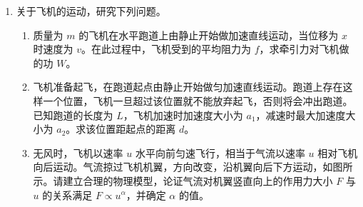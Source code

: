 \documentclass[\gkver]{gaokaozhenti}
\begin{document}
\begin{enumerate}
{粒子 2 的动量 $p_{2} = mv_{2}$

结合前面的分析可得 $p_{2} = \frac{qBR}{v_{1}} \cdot v_{2} = \frac{qBR \cdot d}{\theta R} = \frac{qBd}{\theta}$。
}

\item
关于飞机的运动，研究下列问题。
\begin{enumerate}
	\item
	质量为 $m$ 的飞机在水平跑道上由静止开始做加速直线运动，当位移为 $x$ 时速度为 $v$。在此过程中，飞机受到的平均阻力为 $f$，求牵引力对飞机做的功 $W$。
	\item
	飞机准备起飞，在跑道起点由静止开始做匀加速直线运动。跑道上存在这样一个位置，飞机一旦超过该位置就不能放弃起飞，否则将会冲出跑道。已知跑道的长度为 $L$，飞机加速时加速度大小为 $a_{1}$，减速时最大加速度大小为 $a_{2}$。求该位置距起点的距离 $d$。
	\item
	无风时，飞机以速率 $u$ 水平向前匀速飞行，相当于气流以速率 $u$ 相对飞机向后运动。气流掠过飞机机翼，方向改变，沿机翼向后下方运动，如图所示。请建立合理的物理模型，论证气流对机翼竖直向上的作用力大小 $F$ 与 $u$ 的关系满足 $F \propto u^{\alpha}$，并确定 $\alpha$ 的值。
\end{enumerate}

\onepicture[align=right, h=5.17cm]{}

\end{enumerate}
\end{document}
